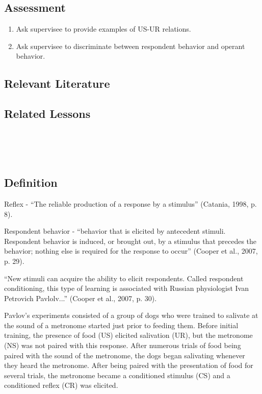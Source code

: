 \subsection{Assessment}
\begin{enumerate}
\item Ask supervisee to provide examples of US-UR relations.
\item Ask supervisee to discriminate between respondent behavior and operant behavior.
%
\end{enumerate}
%
\subsection{Relevant Literature}
\begin{refsection}
\nocite{bijou1961child,
        cooper2007applied,
        pavlov1927conditional}
\printbibliography[heading=none]
\end{refsection}

%
\subsection{Related Lessons}
\fourFKFourteen{}\\
\fourFKFifteen{}\\
\fourFKSixteen{}\\
%
\subsection{Definition} 
Reflex - ``The reliable production of a response by a stimulus'' (Catania, 1998, p. 8).

Respondent behavior - ``behavior that is elicited by antecedent stimuli. Respondent behavior is induced, or brought out, by a stimulus that precedes the behavior; nothing else is required for the response to occur'' (Cooper et al., 2007, p. 29).

``New stimuli can acquire the ability to elicit respondents. Called respondent conditioning, this type of learning is associated with Russian physiologist Ivan Petrovich Pavlolv...'' (Cooper et al., 2007, p. 30).

Pavlov's experiments consisted of a group of dogs who were trained to salivate at the sound of a metronome started just prior to feeding them. Before initial training, the presence of food (US) elicited salivation (UR), but the metronome (NS) was not paired with this response. After numerous trials of food being paired with the sound of the metronome, the dogs began salivating whenever they heard the metronome. After being paired with the presentation of food for several trials, the metronome became a conditioned stimulus (CS) and a conditioned reflex (CR) was elicited. 

